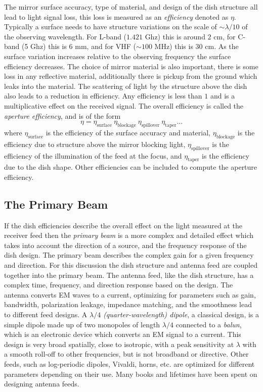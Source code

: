 \documentclass[usenatbib,usegraphicx]{article}
\begin{document}
The mirror surface accuracy, type of material, and design of the dish structure all lead to light signal loss, this loss is measured as an \emph{efficiency} denoted as $\eta$.
Typically a surface needs to have structure variations on the scale of $\sim \lambda/10$ of the observing wavelength.
For L-band ($1.421$ Ghz) this is around $2$ cm, for C-band (5 Ghz) this is $6$ mm, and for VHF ($\sim 100$ MHz) this is $30$ cm.
As the surface variation increases relative to the observing frequency the surface efficiency decreases.
The choice of mirror material is also important, there is some loss in any reflective material, additionally there is pickup from the ground which leaks into the material.
The scattering of light by the structure above the dish also leads to a reduction in efficiency.
Any efficiency is less than $1$ and is a multiplicative effect on the received signal.
The overall efficiency is called the \emph{aperture efficiency}, and is of the form
%
\begin{equation}
\label{eq:efficiency}
\eta = \eta_{\text{surface}} ~ \eta_{\text{blockage}} ~ \eta_{\text{spillover}} ~ \eta_{\text{taper}} \ldots
\end{equation}
%
where $\eta_{\text{surface}}$ is the efficiency of the surface accuracy and material, $\eta_{\text{blockage}}$ is the efficiency due to structure above the mirror blocking light, $\eta_{\text{spillover}}$ is the efficiency of the illumination of the feed at the focus, and $\eta_{\text{taper}}$ is the efficiency due to the dish shape.
Other efficiencies can be included to compute the aperture efficiency.

\subsection{The Primary Beam}

If the dish efficiencies describe the overall effect on the light measured at the receiver feed then the \emph{primary beam} is a more complex and detailed effect which takes into account the direction of a source, and the frequency response of the dish design.
The primary beam describes the complex gain for a given frequency and direction.
For this discussion the dish structure and antenna feed are coupled together into the primary beam.
The antenna feed, like the dish structure, has a complex time, frequency, and direction response based on the design.
The antenna converts EM waves to a current, optimizing for parameters such as gain, bandwidth, polarization leakage, impedance matching, and the smoothness lead to different feed designs.
A \emph{$\lambda/4$ (quarter-wavelength) dipole}, a classical design, is a simple dipole made up of two monopoles of length $\lambda/4$ connected to a \emph{balun}, which is an electronic device which converts an EM signal to a current.
This design is very broad spatially, close to isotropic, with a peak sensitivity at $\lambda$ with a smooth roll-off to other frequencies, but is not broadband or directive.
Other feeds, such as log-periodic dipoles, Vivaldi, horns, etc. are optimized for different parameters depending on their use.
Many books and lifetimes have been spent on designing antenna feeds.
\end{document}
